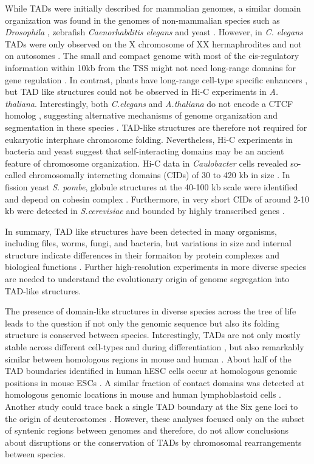 \documentclass[a4paper,twoside=true,openright,parskip=full,chapterprefix=true,11pt,headings=normal,bibliography=totoc,listof=totoc,titlepage=on,captions=tableabove,draft=false]{scrreprt}
\theoremstyle{definition}
\theoremstyle{definition}
\theoremstyle{definition}
\theoremstyle{remark}
\begin{document}
While TADs were initially described for mammalian genomes, a similar
domain organization was found in the genomes of non-mammalian species
such as \emph{Drosophila} \citep{Sexton2012}, zebrafish
\citep{Gomez-Marin2015} \emph{Caenorhabditis elegans} \citep{Crane2015}
and yeast \citep{Hsieh2015, Mizuguchi2014}. However, in \emph{C.
elegans} TADs were only observed on the X chromosome of XX
hermaphrodites and not on autosomes \citep{Crane2015}. The small and
compact genome with most of the cis-regulatory information within 10kb
from the TSS might not need long-range domains for gene regulation
\citep{Long2016}. In contrast, plants have long-range cell-type specific
enhancers \citep{Zhu2015}, but TAD like structures could not be observed
in Hi-C experiments in \emph{A. thaliana}. Interestingly, both
\emph{C.elegans} and \emph{A.thaliana} do not encode a CTCF homolog
\citep{Heger2012}, suggesting alternative mechanisms of genome
organization and segmentation in these species \citep{Long2016}.
TAD-like structures are therefore not required for eukaryotic interphase
chromosome folding. Nevertheless, Hi-C experiments in bacteria and yeast
suggest that self-interacting domains may be an ancient feature of
chromosome organization. Hi-C data in \emph{Caulobacter} cells revealed
so-called chromosomally interacting domains (CIDs) of 30 to 420 kb in
size \citep{Le2013}. In fission yeast \emph{S. pombe}, globule
structures at the 40-100 kb scale were identified and depend on cohesin
complex \citep{Mizuguchi2014}. Furthermore, in very short CIDs of around
2-10 kb were detected in \emph{S.cerevisiae} and bounded by highly
transcribed genes \citep{Hsieh2015}.

In summary, TAD like structures have been detected in many organisms,
including files, worms, fungi, and bacteria, but variations in size and
internal structure indicate differences in their formaiton by protein
complexes and biological functions \citep{Dekker2015}. Further
high-resolution experiments in more diverse species are needed to
understand the evolutionary origin of genome segregation into TAD-like
structures.

The presence of domain-like structures in diverse species across the
tree of life leads to the question if not only the genomic sequence but
also its folding structure is conserved between species. Interestingly,
TADs are not only mostly stable across different cell-types
\citep{Dixon2012, Rao2014} and during differentiation \citep{Dixon2015},
but also remarkably similar between homologous regions in mouse and
human \citep{Dixon2012}. About half of the TAD boundaries identified in
human hESC cells occur at homologous genomic positions in mouse ESCs
\citep{Dixon2012}. A similar fraction of contact domains was detected at
homologous genomic locations in mouse and human lymphoblastoid cells
\citep{Rao2014}. Another study could trace back a single TAD boundary at
the Six gene loci to the origin of deuterostomes
\citep{Gomez-Marin2015}. However, these analyses focused only on the
subset of syntenic regions between genomes and therefore, do not allow
conclusions about disruptions or the conservation of TADs by chromosomal
rearrangements between species.
\end{document}

